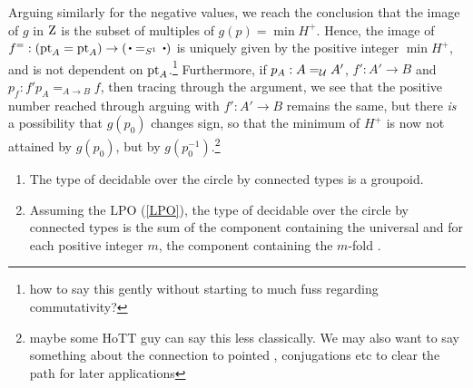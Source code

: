 
Arguing similarly for the negative values, we reach the conclusion that the image of $g$ in $\mathrm{Z}$ is the subset of multiples of $g(p)=\min H^+$.  Hence, the image of $f^=:(\pt_A=\pt_A)\to(\base=_{\Sc}\base)$ is uniquely given by the positive integer $\min H^+$, and is not dependent on ${\mathord{\mathrm{pt}}}_A$.\footnote{how to say this gently without starting to much fuss regarding commutativity?}  Furthermore, if $p_A:A=_{\mathcal{U}}A'$, $f':A'\to B$ and $p_f:f'p_A=_{A\to B}f$, then tracing through the argument, we see that the positive number reached through arguing with $f':A'\to B$ remains the same, but there \emph{is} a possibility that $g(p_0)$ changes sign, so that the minimum of $H^+$ is now not attained by $g(p_0)$, but by $g(p_0^{-1})$.\footnote{maybe some HoTT guy can say this less classically.  We may also want to say something about the connection to pointed \coverings, conjugations etc to clear the path for later applications}

\begin{lemma}
  \label{lem:componentsofcoversofS1}
  \begin{enumerate}
  \item The type of decidable \coverings over the circle by connected types is a groupoid.
  \item Assuming the LPO (\cref{LPO}), the type of decidable \coverings over the circle by connected types is the sum of the component containing the universal \covering and for each positive integer $m$, the component containing the $m$-fold \covering.
  \end{enumerate}

\end{lemma}

\nocite{contructive-algebra}

